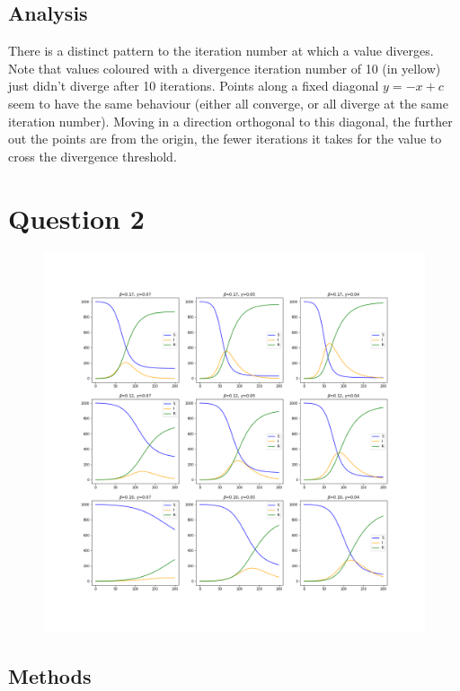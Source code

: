 \documentclass{article}
\begin{document}
\subsection*{Analysis}

There is a distinct pattern to the iteration number at which a value diverges. Note that values coloured with a divergence iteration number of 10 (in yellow) just didn't diverge after 10 iterations. Points along a fixed diagonal $y = -x + c$ seem to have the same behaviour (either all converge, or all diverge at the same iteration number). Moving in a direction orthogonal to this diagonal, the further out the points are from the origin, the fewer iterations it takes for the value to cross the divergence threshold. 

\newpage 

\section*{Question 2}

\begin{figure}[!htbp]
	\centering
	\includegraphics[width=1.2\linewidth]{q2.png}
\end{figure}

\subsection*{Methods}
\end{document}
